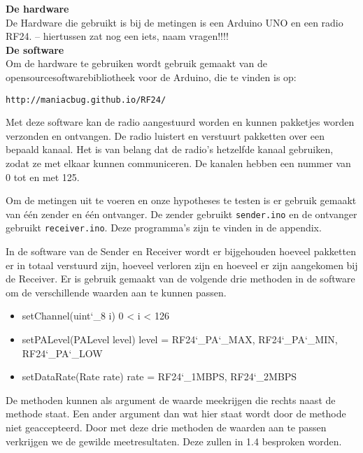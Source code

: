 \documentclass{article}
\begin{document}
\textbf{De hardware}\\
De Hardware die gebruikt is bij de metingen is een Arduino UNO en een radio RF24. -- hiertussen zat nog een iets, naam vragen!!!!\\

\textbf{ De software}\\
Om de hardware te gebruiken wordt gebruik gemaakt van de opensourcesoftwarebibliotheek voor de Arduino, die te vinden is op: \begin{verbatim}
http://maniacbug.github.io/RF24/
\end{verbatim} 

Met deze software kan de radio aangestuurd worden en kunnen pakketjes worden verzonden en ontvangen. De radio luistert en verstuurt pakketten over een bepaald kanaal. Het is van belang dat de radio's hetzelfde kanaal gebruiken, zodat ze met elkaar kunnen communiceren. De kanalen hebben een nummer van 0 tot en met 125. 

Om de metingen uit te voeren en onze hypotheses te testen is er gebruik gemaakt van \'{e}\'{e}n zender en \'{e}\'{e}n ontvanger. De zender gebruikt \texttt{sender.ino} en de ontvanger gebruikt \texttt{receiver.ino}. Deze programma's zijn te vinden in de appendix.

In de software van de Sender en Receiver wordt er bijgehouden hoeveel pakketten er in totaal verstuurd zijn, hoeveel verloren zijn en hoeveel er zijn aangekomen bij de Receiver. Er is gebruik gemaakt van de volgende drie methoden in de software om de verschillende waarden aan te kunnen passen. 
\begin{itemize}
	\item setChannel(uint\char`_8 i)  0 < i < 126
	\item setPALevel(PALevel level) level = RF24\char`_PA\char`_MAX, RF24\char`_PA\char`_MIN, RF24\char`_PA\char`_LOW 
	\item setDataRate(Rate rate) rate = RF24\char`_1MBPS, RF24\char`_2MBPS
\end{itemize}
De methoden kunnen als argument de waarde meekrijgen die rechts naast de methode staat. Een ander argument dan wat hier staat wordt door de methode niet geaccepteerd. 
Door met deze drie methoden de waarden aan te passen verkrijgen we de gewilde meetresultaten. Deze zullen in 1.4 besproken worden.
\end{document}
